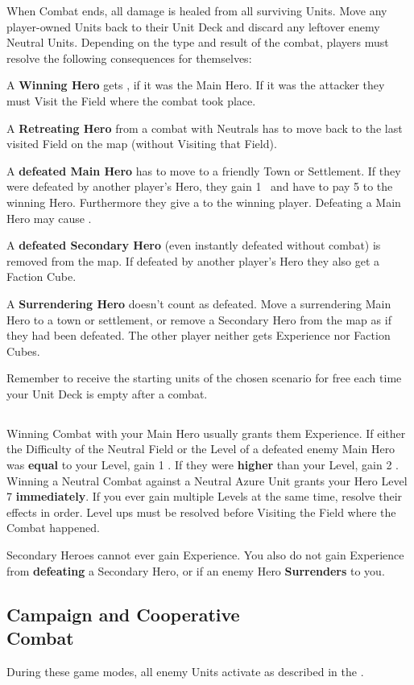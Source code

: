 \begin{multicols*}{2}
When Combat ends, all damage is healed from all surviving Units. Move any player-owned Units back to their Unit Deck and discard any leftover enemy Neutral Units. Depending on the type and result of the combat, players must resolve the following consequences for themselves:

A \textbf{Winning Hero} gets , if it was the Main Hero. If it was the attacker they must Visit the Field where the combat took place.\par
A \textbf{Retreating Hero} from a combat with Neutrals has to move back to the last visited Field on the map (without Visiting that Field).\par
A \textbf{defeated Main Hero} has to move to a friendly Town or Settlement. If they were defeated by another player's Hero, they gain 1~ and have to pay 5  to the winning Hero. Furthermore they give a  to the winning player. Defeating a Main Hero may cause .\par
A \textbf{defeated Secondary Hero} (even instantly defeated without combat) is removed from the map. If defeated by another player's Hero they also get a Faction Cube.\par
A \textbf{Surrendering Hero} doesn't count as defeated. Move a surrendering Main Hero to a town or settlement, or remove a Secondary Hero from the map as if they had been defeated. The other player neither gets Experience nor Faction Cubes.\par
Remember to receive the starting units of the chosen scenario for free each time your Unit Deck is empty after a combat.

\subsection*{}

Winning Combat with your Main Hero usually grants them Experience.
If either the Difficulty of the Neutral Field or the Level of a defeated enemy Main Hero was \textbf{equal} to your Level, gain 1 .
If they were \textbf{higher} than your Level, gain 2 .
Winning a Neutral Combat against a Neutral Azure  Unit grants your Hero Level 7 \textbf{immediately}.
If you ever gain multiple Levels at the same time, resolve their effects in order.
Level ups must be resolved before Visiting the Field where the Combat happened.\par
Secondary Heroes cannot ever gain Experience.
You also do not gain Experience from \textbf{defeating} a Secondary Hero, or if an enemy Hero \textbf{Surrenders} to you.

\subsection*{Campaign and Cooperative\\Combat}
During these game modes, all enemy Units activate as described in the .

\end{multicols*}

